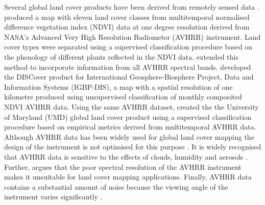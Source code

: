 \documentclass{icldt}\usepackage[]{graphicx}\usepackage[]{color}
\begin{document}
Several global land cover products have been derived from remotely sensed data \citep{Herold2008}. \citet{Defries1994} produced a map with eleven land cover classes from multitemporal normalised difference vegetation index (NDVI) data at one degree resolution derived from NASA's Advanced Very High Resolution Radiometer (AVHRR) instrument. Land cover types were separated using a supervised classification procedure based on the phenology of different plants reflected in the NDVI data. \citet{Defries1998} extended this method to incorporate  information from all AVHRR spectral bands. \citet{Loveland2000} developed the DISCover product for International Geosphere-Biosphere Project, Data and Information Systems (IGBP-DIS), a map with a spatial resolution of one kilometre produced using unsupervised classification of monthly composited NDVI AVHRR data. Using the same AVHRR dataset, \citet{Hansen2000} created the the University of Maryland (UMD) global land cover product using a supervised classification procedure based on empirical metrics derived from multitemporal AVHRR data. Although AVHRR data has been widely used for global land cover mapping the design of the instrument is not optimised for this purpose \citep{Friedl2002}. It is widely recognised that AVHRR data is sensitive to the effects of clouds, humidity and aerosols \citep[e.g.][]{Nemani1997,Loveland2000,Friedl2002}. Further, \citet{Friedl2000} argues that the poor spectral resolution of the AVHRR instrument makes it unsuitable for land cover mapping applications. Finally, AVHRR data contains a substantial amount of noise because the viewing angle of the instrument varies significantly \citep{Cihlar1994,Friedl2002}. \\
\end{document}
